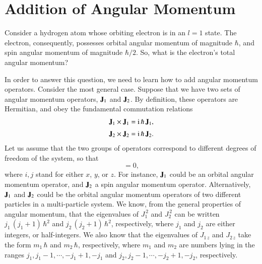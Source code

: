 \chapter{Addition of Angular Momentum}\label{c6}

Consider a hydrogen atom whose orbiting electron is in an $l=1$ state. The electron, consequently, 
possesses orbital angular momentum of magnitude $\hbar$, and spin angular
momentum of magnitude $\hbar/2$. So, what is the electron's total angular momentum? 

In order to answer this question, we need to learn how to add
angular momentum operators. Consider the most general case. Suppose
that we have two sets of angular momentum operators, ${\bf J}_1$ and ${\bf J}_2$.
By definition, these operators are Hermitian, and obey the fundamental commutation
relations
\begin{align}
{\bf J}_1\times {\bf J}_1& = {\rm i}\,\hbar\,{\bf J}_1,\\[0.5ex]
{\bf J}_2\times {\bf J}_2& = {\rm i}\,\hbar\,{\bf J}_2.
\end{align}
Let us assume that the two groups of operators  correspond to different degrees
of freedom of the system, so that 
\begin{equation}
[J_{1\,i}, J_{2\,j}] = 0,
\end{equation}
where $i, j$ stand for either $x$, $y$, or $z$. 
For instance, ${\bf J}_1$ could be an orbital angular momentum operator, and ${\bf J}_2$
a spin angular momentum operator. Alternatively, ${\bf J}_1$ and ${\bf J}_2$ could
be the orbital angular momentum operators
 of two different particles in a multi-particle
system. We know, from the general
properties of angular momentum, that the eigenvalues of $J_1^{\,2}$ and $J_2^{\,2}$ 
can be
written $j_1\,(j_1+1)\,\hbar^2$ and $j_2\,(j_2+1)\, \hbar^2$, respectively, where
$j_1$ and $j_2$ are either integers, or half-integers. We also know that the
eigenvalues of $J_{1\,z}$ and $J_{2\,z}$ take the form $m_1\,\hbar$ and
$m_2\,\hbar$, respectively, where $m_1$ and $m_2$ are numbers
lying  in the ranges $j_1, j_1-1,\cdots,
-j_1+1, -j_1$ and  $j_2, j_2-1,\cdots,
-j_2+1, -j_2$, respectively.

